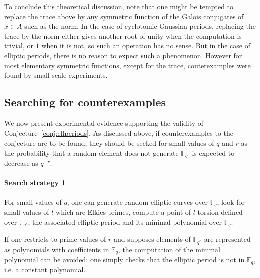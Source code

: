 \documentclass[12pt]{article}
\theoremstyle{plain}
\theoremstyle{definition}
\def\F{\ensuremath{\mathbb{F}}}
\begin{document}
To conclude this theoretical discussion, note that one might be tempted to
replace the trace above by any symmetric function of the
Galois conjugates of $x \in A$ such as the norm.
In the case of cyclotomic Gaussian periods,
replacing the trace by the norm either gives another root of unity
when the computation is trivial, or $1$ when it is not,
so such an operation has no sense.
But in the case of elliptic periods, there is no reason to expect such a
phenomenon.
However for most elementary symmetric functions, except for the trace,
couterexamples were found by small scale experiments.

\subsection{Searching for counterexamples}

We now present experimental evidence supporting the validity of
Conjecture~\ref{conj:ellperiods}.
As discussed above, if counterexamples to the conjecture
are to be found, they should be seeked
for small values of $q$ and $r$ as the probability that a random element
does not generate $\F_{q^r}$ is expected to decrease as $q^{-r}$.

\paragraph{Search strategy 1}
For small values of $q$,
one can generate random elliptic curves over $\F_q$,
look for small values of $l$ which are Elkies primes,
compute a point of $l$-torsion defined over $\F_{q^r}$,
the associated elliptic period and its minimal polynomial over $\F_q$.

If one restricts to prime values of $r$ and supposes elements
of $\F_{q^r}$ are represented as polynomials with coefficients in $\F_q$,
the computation of the minimal polynomial can be avoided:
one simply checks that the elliptic period is not in $\F_q$,
i.e. a constant polynomial.
\end{document}
